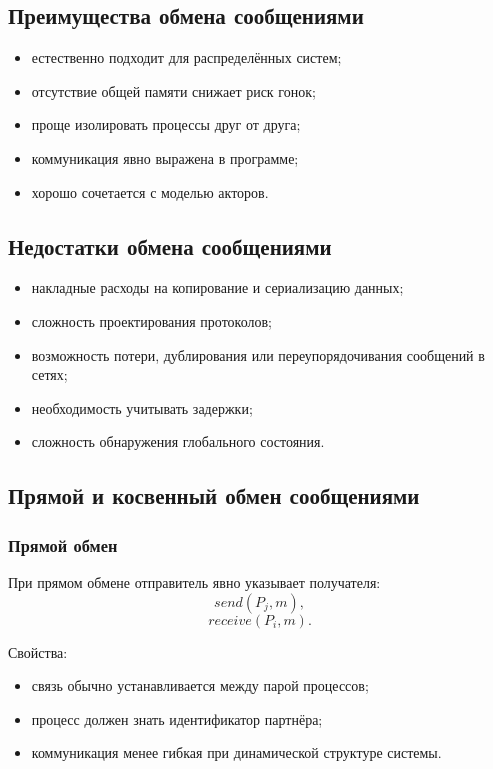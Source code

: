 \documentclass[12pt,a4paper]{article}
\begin{document}
\subsection{Преимущества обмена сообщениями}

\begin{itemize}
    \item естественно подходит для распределённых систем;
    \item отсутствие общей памяти снижает риск гонок;
    \item проще изолировать процессы друг от друга;
    \item коммуникация явно выражена в программе;
    \item хорошо сочетается с моделью акторов.
\end{itemize}

\subsection{Недостатки обмена сообщениями}

\begin{itemize}
    \item накладные расходы на копирование и сериализацию данных;
    \item сложность проектирования протоколов;
    \item возможность потери, дублирования или переупорядочивания сообщений в сетях;
    \item необходимость учитывать задержки;
    \item сложность обнаружения глобального состояния.
\end{itemize}

\subsection{Прямой и косвенный обмен сообщениями}

\subsubsection{Прямой обмен}

При прямом обмене отправитель явно указывает получателя:
\[
send(P_j, m),
\]
\[
receive(P_i, m).
\]

Свойства:
\begin{itemize}
    \item связь обычно устанавливается между парой процессов;
    \item процесс должен знать идентификатор партнёра;
    \item коммуникация менее гибкая при динамической структуре системы.
\end{itemize}
\end{document}
